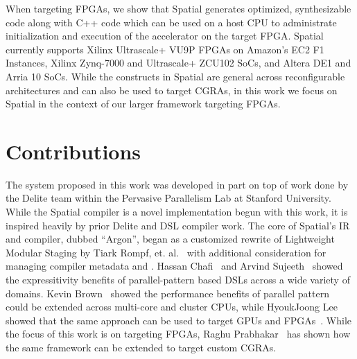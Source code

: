 When targeting FPGAs, we show that Spatial generates optimized, synthesizable
code along with C++ code which can be used on a host CPU to administrate
initialization and execution of the accelerator on the target FPGA.
Spatial currently supports Xilinx Ultrascale+ VU9P FPGAs on Amazon's
EC2 F1 Instances, Xilinx Zynq-7000 and Ultrascale+ ZCU102 SoCs, and Altera DE1 and Arria 10 SoCs.
While the constructs in Spatial are general across reconfigurable architectures
and can also be used to target CGRAs, in this work we focus on Spatial in the
context of our larger framework targeting FPGAs.

\section{Contributions}
The system proposed in this work was developed in part on top of work done by
the Delite team within the Pervasive Parallelism Lab at Stanford University.
While the Spatial compiler is a novel implementation begun with this work, it
is inspired heavily by prior Delite and DSL compiler work.
The core of Spatial's IR and compiler,
dubbed ``Argon'', began as a customized rewrite of Lightweight Modular Staging
by Tiark Rompf, et. al.~\cite{tiark-thesis,lms} with additional consideration for managing
compiler metadata and .
Hassan Chafi~\cite{hassan-thesis} and
Arvind Sujeeth~\cite{arvind-thesis} showed the expressitivity benefits of
parallel-pattern based DSLs across a wide variety of domains.
Kevin Brown~\cite{kevin-thesis}
showed the performance benefits of parallel pattern
could be extended across multi-core and cluster CPUs, while
HyoukJoong Lee showed that the same approach can be used to target GPUs
and FPGAs~\cite{hj-thesis}. While the focus of this work is on targeting FPGAs,
Raghu Prabhakar~\cite{raghu-thesis} has shown how the same framework can be
extended to target custom CGRAs.

